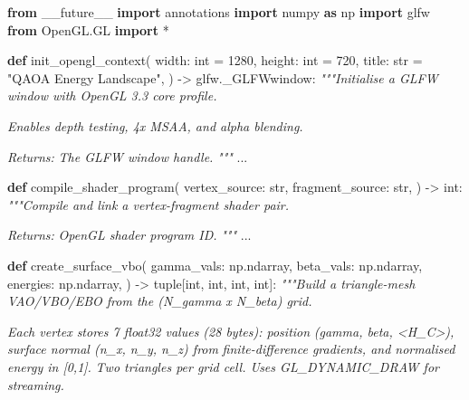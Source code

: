 \documentclass[
  11pt,
]{report}
\newenvironment{Shaded}{}{}
\newcommand{\BuiltInTok}[1]{\textcolor[rgb]{0.00,0.50,0.00}{#1}}
\newcommand{\CommentTok}[1]{\textcolor[rgb]{0.38,0.63,0.69}{\textit{#1}}}
\newcommand{\DecValTok}[1]{\textcolor[rgb]{0.25,0.63,0.44}{#1}}
\newcommand{\ImportTok}[1]{\textcolor[rgb]{0.00,0.50,0.00}{\textbf{#1}}}
\newcommand{\KeywordTok}[1]{\textcolor[rgb]{0.00,0.44,0.13}{\textbf{#1}}}
\newcommand{\NormalTok}[1]{#1}
\newcommand{\OperatorTok}[1]{\textcolor[rgb]{0.40,0.40,0.40}{#1}}
\newcommand{\StringTok}[1]{\textcolor[rgb]{0.25,0.44,0.63}{#1}}
\begin{document}
\begin{Shaded}
\begin{Highlighting}[]
\ImportTok{from}\NormalTok{ \_\_future\_\_ }\ImportTok{import}\NormalTok{ annotations}
\ImportTok{import}\NormalTok{ numpy }\ImportTok{as}\NormalTok{ np}
\ImportTok{import}\NormalTok{ glfw}
\ImportTok{from}\NormalTok{ OpenGL.GL }\ImportTok{import} \OperatorTok{*}


\KeywordTok{def}\NormalTok{ init\_opengl\_context(}
\NormalTok{    width: }\BuiltInTok{int} \OperatorTok{=} \DecValTok{1280}\NormalTok{,}
\NormalTok{    height: }\BuiltInTok{int} \OperatorTok{=} \DecValTok{720}\NormalTok{,}
\NormalTok{    title: }\BuiltInTok{str} \OperatorTok{=} \StringTok{"QAOA Energy Landscape"}\NormalTok{,}
\NormalTok{) }\OperatorTok{{-}\textgreater{}}\NormalTok{ glfw.\_GLFWwindow:}
    \CommentTok{"""Initialise a GLFW window with OpenGL 3.3 core profile.}

\CommentTok{    Enables depth testing, 4x MSAA, and alpha blending.}

\CommentTok{    Returns:}
\CommentTok{        The GLFW window handle.}
\CommentTok{    """}
\NormalTok{    ...}


\KeywordTok{def}\NormalTok{ compile\_shader\_program(}
\NormalTok{    vertex\_source: }\BuiltInTok{str}\NormalTok{,}
\NormalTok{    fragment\_source: }\BuiltInTok{str}\NormalTok{,}
\NormalTok{) }\OperatorTok{{-}\textgreater{}} \BuiltInTok{int}\NormalTok{:}
    \CommentTok{"""Compile and link a vertex{-}fragment shader pair.}

\CommentTok{    Returns:}
\CommentTok{        OpenGL shader program ID.}
\CommentTok{    """}
\NormalTok{    ...}


\KeywordTok{def}\NormalTok{ create\_surface\_vbo(}
\NormalTok{    gamma\_vals: np.ndarray,}
\NormalTok{    beta\_vals: np.ndarray,}
\NormalTok{    energies: np.ndarray,}
\NormalTok{) }\OperatorTok{{-}\textgreater{}} \BuiltInTok{tuple}\NormalTok{[}\BuiltInTok{int}\NormalTok{, }\BuiltInTok{int}\NormalTok{, }\BuiltInTok{int}\NormalTok{, }\BuiltInTok{int}\NormalTok{]:}
    \CommentTok{"""Build a triangle{-}mesh VAO/VBO/EBO from the (N\_gamma x N\_beta) grid.}

\CommentTok{    Each vertex stores 7 float32 values (28 bytes): position}
\CommentTok{    (gamma, beta, \textless{}H\_C\textgreater{}), surface normal (n\_x, n\_y, n\_z) from}
\CommentTok{    finite{-}difference gradients, and normalised energy in [0,1].}
\CommentTok{    Two triangles per grid cell. Uses GL\_DYNAMIC\_DRAW for streaming.}


\end{Highlighting}
\end{Shaded}
\end{document}
